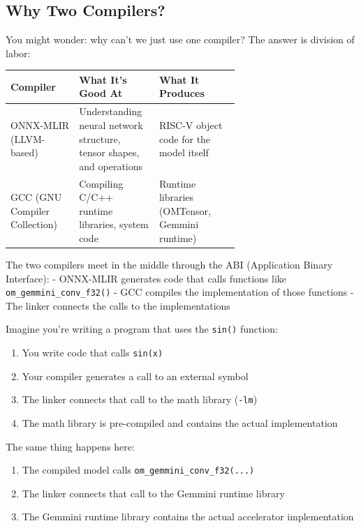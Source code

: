 \documentclass[12pt,a4paper]{article}
\begin{document}
\subsection{Why Two Compilers?}

You might wonder: why can't we just use one compiler? The answer is division of labor:

\begin{table}[H]
\centering
\small
\begin{tabularx}{\linewidth}{@{}L{0.30\linewidth}L{0.35\linewidth}Y@{}}
\toprule
\textbf{Compiler} & \textbf{What It's Good At} & \textbf{What It Produces} \\
\midrule
ONNX-MLIR (LLVM-based) & Understanding neural network structure, tensor shapes, and operations & RISC-V object code for the model itself \\
GCC (GNU Compiler Collection) & Compiling C/C++ runtime libraries, system code & Runtime libraries (OMTensor, Gemmini runtime) \\
\bottomrule
\end{tabularx}
\end{table}

The two compilers meet in the middle through the ABI (Application Binary Interface):
- ONNX-MLIR generates code that calls functions like \texttt{om\_gemmini\_conv\_f32()}
- GCC compiles the implementation of those functions
- The linker connects the calls to the implementations

\begin{analogyenv}
Imagine you're writing a program that uses the \texttt{sin()} function:
\begin{enumerate}
  \item You write code that calls \texttt{sin(x)}
  \item Your compiler generates a call to an external symbol
  \item The linker connects that call to the math library (\texttt{-lm})
  \item The math library is pre-compiled and contains the actual implementation
\end{enumerate}

The same thing happens here:
\begin{enumerate}
  \item The compiled model calls \texttt{om\_gemmini\_conv\_f32(...)}
  \item The linker connects that call to the Gemmini runtime library
  \item The Gemmini runtime library contains the actual accelerator implementation
\end{enumerate}
\end{analogyenv}
\end{document}
